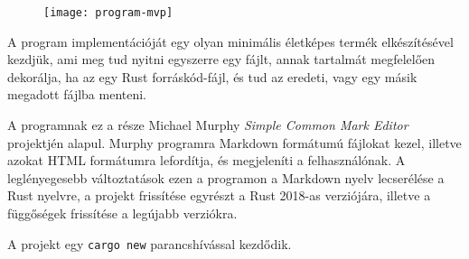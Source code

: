 
\graphicspath{{./kepek/}}


\begin{figure}[h]
    \texttt{[image: program-mvp]}
    \centering
\end{figure}

A program implementációját egy olyan minimális életképes termék elkészítésével kezdjük,
ami meg tud nyitni egyszerre egy fájlt, annak tartalmát megfelelően dekorálja,
ha az egy Rust forráskód-fájl, és tud az eredeti, vagy egy másik megadott fájlba menteni.

A programnak ez a része Michael Murphy \textit{Simple Common Mark Editor} projektjén alapul.\cite{gtk_tutorial}
Murphy programra Markdown formátumú fájlokat kezel, illetve azokat HTML formátumra lefordítja,
és megjeleníti a felhasználónak.
A leglényegesebb változtatások ezen a programon a Markdown nyelv lecserélése a Rust nyelvre,
a projekt frissítése egyrészt a Rust 2018-as verziójára, illetve a függőségek frissítése a legújabb verziókra.

A projekt egy \texttt{cargo new} parancshívással kezdődik.



